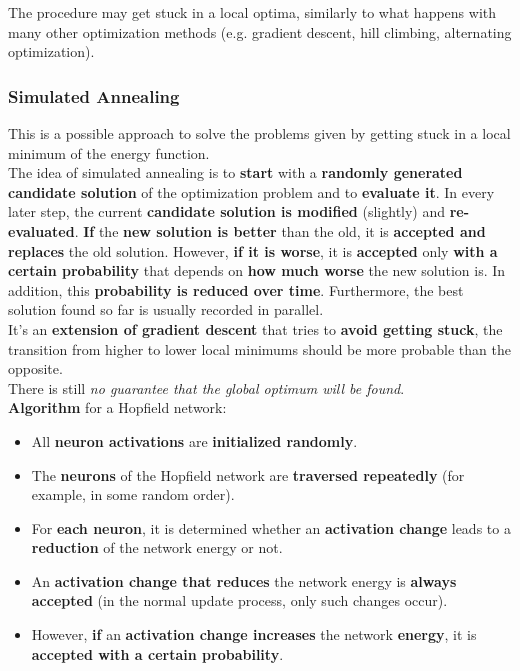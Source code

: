 The procedure may get stuck in a local optima, similarly to what happens with many other optimization methods (e.g. gradient descent, hill climbing, alternating optimization).\\

\newpage

\subsubsection{Simulated Annealing}
This is a possible approach to solve the problems given by getting stuck in a local minimum of the energy function.\\

The idea of simulated annealing is to \textbf{start} with a \textbf{randomly generated candidate solution} of the optimization problem and to \textbf{evaluate it}. In every later step, the current \textbf{candidate solution is modified} (slightly) and \textbf{re-evaluated}. \textbf{If} the \textbf{new solution is better} than the old, it is \textbf{accepted and replaces} the old solution. However, \textbf{if it is worse}, it is \textbf{accepted} only \textbf{with a certain probability} that depends on \textbf{how much worse} the new solution is. In addition, this \textbf{probability is reduced over time}. Furthermore, the best solution found so far is usually recorded in parallel.\\

It's an \textbf{extension of gradient descent} that tries to \textbf{avoid getting stuck}, the transition from higher to lower local minimums should be more probable than the opposite.\\

There is still \textit{no guarantee that the global optimum will be found}.\\

\textbf{Algorithm} for a Hopfield network:
\begin{itemize}
	\item All \textbf{neuron activations} are \textbf{initialized randomly}.\\
	
	\item The \textbf{neurons} of the Hopfield network are \textbf{traversed repeatedly} (for example, in some random order).\\
	
	\item For \textbf{each neuron}, it is determined whether an \textbf{activation change} leads to a \textbf{reduction} of the network energy or not.\\
	
	\item An \textbf{activation change that reduces} the network energy is \textbf{always accepted} (in the normal update process, only such changes occur).\\
	
	\item However, \textbf{if} an \textbf{activation change increases} the network \textbf{energy}, it is \textbf{accepted with a certain probability}.\\
\end{itemize}

